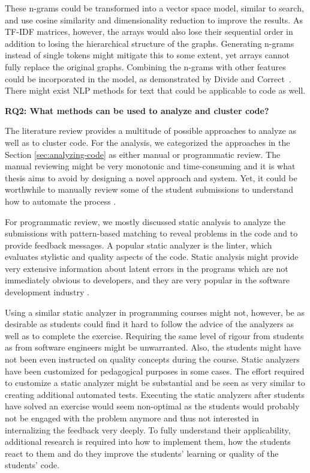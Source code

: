 These n-grams could be transformed into a vector space model, similar to search, and use cosine similarity and dimensionality reduction to improve the results. As TF-IDF matrices, however, the arrays would also lose their sequential order in addition to losing the hierarchical structure of the graphs. Generating n-grams instead of single tokens might mitigate this to some extent, yet arrays cannot fully replace the original graphs. Combining the n-grams with other features could be incorporated in the model, as demonstrated by Divide and Correct~\cite{divide-and-correct}. There might exist NLP methods for text that could be applicable to code as well.

\bigskip
\noindent
\textbf{RQ2: What methods can be used to analyze and cluster code?}
\bigskip

\noindent
The literature review provides a multitude of possible approaches to analyze as well as to cluster code. For the analysis, we categorized the approaches in the Section \ref{sec:analyzing-code} as either manual or programmatic review. The manual reviewing might be very monotonic and time-consuming and it is what thesis aims to avoid by designing a novel approach and system. Yet, it could be worthwhile to manually review some of the student submissions to understand how to automate the process \cite{glass-feature-engineering, rogers-auto-style-2014, luxton-sub-variation-2013}.

For programmatic review, we mostly discussed static analysis to analyze the submissions with pattern-based matching to reveal problems in the code and to provide feedback messages. A popular static analyzer is the linter\cite{lint-1988}, which evaluates stylistic and quality aspects of the code. Static analysis might provide very extensive information about latent errors in the programs which are not immediately obvious to developers, and they are very popular in the software development industry \cite{fb-static-dynamic-analysis}.

Using a similar static analyzer in programming courses might not, however, be as desirable as students could find it hard to follow the advice of the analyzers as well as to complete the exercise. Requiring the same level of rigour from students as from software engineers might be unwarranted. Also, the students might have not been even instructed on quality concepts during the course\cite{crow-code-quality-2020}. Static analyzers have been customized for pedagogical purposes in some cases\cite{static-analyses-in-py-courses}. The effort required to customize a static analyzer might be substantial and be seen as very similar to creating additional automated tests. Executing the static analyzers after students have solved an exercise would seem non-optimal as the students would probably not be engaged with the problem anymore and thus not interested in internalizing the feedback very deeply. To fully understand their applicability, additional research is required into how to implement them, how the students react to them and do they improve the students' learning or quality of the students' code.

